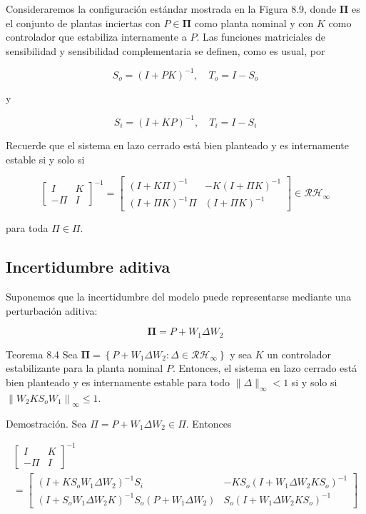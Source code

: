 Consideraremos la configuración estándar mostrada en la Figura 8.9, donde $\boldsymbol{\Pi}$ es el conjunto de plantas inciertas con $P \in \boldsymbol{\Pi}$ como planta nominal y con $K$ como controlador que estabiliza internamente a $P$. Las funciones matriciales de sensibilidad y sensibilidad complementaria se definen, como es usual, por

$$
S_{o}=(I+P K)^{-1}, \quad T_{o}=I-S_{o}
$$

y

$$
S_{i}=(I+K P)^{-1}, \quad T_{i}=I-S_{i}
$$

Recuerde que el sistema en lazo cerrado está bien planteado y es internamente estable si y solo si

$$
\left[\begin{array}{cc}
I & K \\
-\Pi & I
\end{array}\right]^{-1}=\left[\begin{array}{cc}
(I+K \Pi)^{-1} & -K(I+\Pi K)^{-1} \\
(I+\Pi K)^{-1} \Pi & (I+\Pi K)^{-1}
\end{array}\right] \in \mathcal{R} \mathcal{H}_{\infty}
$$

para toda $\Pi \in \Pi$.

\subsection*{Incertidumbre aditiva}
Suponemos que la incertidumbre del modelo puede representarse mediante una perturbación aditiva:

$$
\boldsymbol{\Pi}=P+W_{1} \Delta W_{2}
$$

Teorema 8.4 Sea $\boldsymbol{\Pi}=\left\{P+W_{1} \Delta W_{2}: \Delta \in \mathcal{R} \mathcal{H}_{\infty}\right\}$ y sea $K$ un controlador estabilizante para la planta nominal $P$. Entonces, el sistema en lazo cerrado está bien planteado y es internamente estable para todo $\|\Delta\|_{\infty}<1$ si y solo si $\left\|W_{2} K S_{o} W_{1}\right\|_{\infty} \leq 1$.

Demostración. Sea $\Pi=P+W_{1} \Delta W_{2} \in \Pi$. Entonces

$$
\begin{gathered}
{\left[\begin{array}{cc}
I & K \\
-\Pi & I
\end{array}\right]^{-1}} \\
=\left[\begin{array}{cc}
\left(I+K S_{o} W_{1} \Delta W_{2}\right)^{-1} S_{i} & -K S_{o}\left(I+W_{1} \Delta W_{2} K S_{o}\right)^{-1} \\
\left(I+S_{o} W_{1} \Delta W_{2} K\right)^{-1} S_{o}\left(P+W_{1} \Delta W_{2}\right) & S_{o}\left(I+W_{1} \Delta W_{2} K S_{o}\right)^{-1}
\end{array}\right]
\end{gathered}
$$

